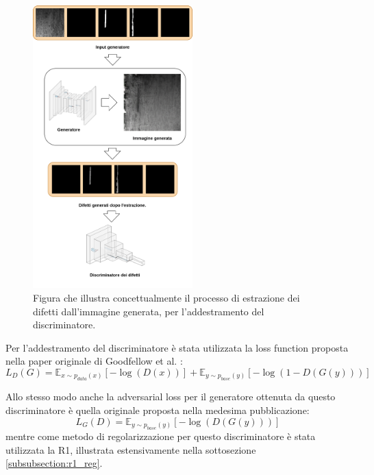 \begin{figure}[H]
    \centering
    \includegraphics[width=0.55\textwidth]{imgs/Coigan/Defects_discriminator_feed.drawio.png}
    \caption{Figura che illustra concettualmente il processo di estrazione dei difetti dall'immagine generata, per l'addestramento del discriminatore.}
    \label{fig:discriminator_defects_extraction}
\end{figure}

Per l'addestramento del discriminatore è stata utilizzata la loss function proposta nella paper originale di Goodfellow et al. 
\cite{goodfellow2014generative}:
\begin{equation}
    L_{D}(G) = \mathbb{E}_{x \sim p_{data}(x)}[- \log(D(x))] + \mathbb{E}_{y \sim p_{base}(y)}[- \log(1 - D(G(y)))]
    \label{eq:discriminator_loss}
\end{equation}

Allo stesso modo anche la adversarial loss per il generatore ottenuta da questo discriminatore è quella originale
proposta nella medesima pubblicazione:
\begin{equation}
    L_{G}(D) = \mathbb{E}_{y \sim p_{base}(y)}[- \log(D(G(y)))]
    \label{eq:generator_loss}
\end{equation}
mentre come metodo di regolarizzazione per questo discriminatore è stata utilizzata la R1, illustrata estensivamente nella sottosezione \ref{subsubsection:r1_reg}.

